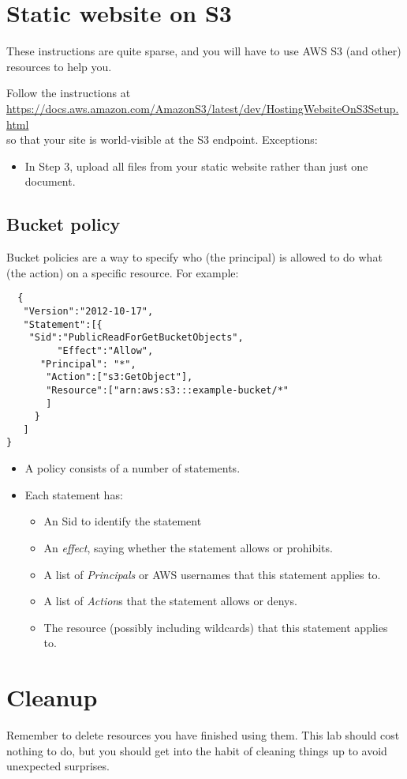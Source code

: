 \documentclass{pgnotes}
\begin{document}
\section{Static website on S3}

These instructions are quite sparse, and you will have to use AWS S3 (and other) resources to help you.

Follow the instructions at \\ \url{https://docs.aws.amazon.com/AmazonS3/latest/dev/HostingWebsiteOnS3Setup.html} \\
so that your site is world-visible at the S3 endpoint.
Exceptions:
\begin{itemize}
\item In Step 3, upload all files from your static website rather than just one document. 
\end{itemize}

\subsection{Bucket policy}

Bucket policies are a way to specify who (the principal) is allowed to do what (the action) on a specific resource. For example: 

\begin{verbatim}
  {
   "Version":"2012-10-17",
   "Statement":[{
 	"Sid":"PublicReadForGetBucketObjects",
         "Effect":"Allow",
 	  "Principal": "*",
       "Action":["s3:GetObject"],
       "Resource":["arn:aws:s3:::example-bucket/*"
       ]
     }
   ]
}
\end{verbatim}

\begin{itemize}
\item A policy consists of a number of statements.
\item Each statement has:
  \begin{itemize}
  \item An Sid to identify the statement
  \item An \textit{effect}, saying whether the statement allows or prohibits.
  \item A list of \textit{Principals} or AWS usernames that this statement applies to.
  \item A list of \textit{Action}s that the statement allows or denys.
  \item The resource (possibly including wildcards) that this statement applies to.
  \end{itemize}
\end{itemize}

\section{Cleanup}

Remember to delete resources you have finished using them.
This lab should cost nothing to do, but you should get into the habit of cleaning things up to avoid unexpected surprises.
\end{document}
